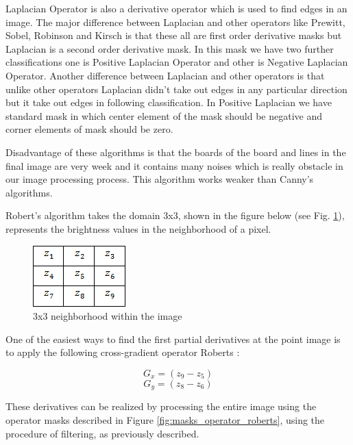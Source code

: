 Laplacian Operator is also a derivative operator which is used to find edges in an image. The major difference between Laplacian and other operators like Prewitt, Sobel, Robinson and Kirsch is that these all are first order derivative masks but Laplacian is a second order derivative mask. In this mask we have two further classifications one is Positive Laplacian Operator and other is Negative Laplacian Operator.
Another difference between Laplacian and other operators is that unlike other operators Laplacian didn’t take out edges in any particular direction but it take out edges in following classification.
In Positive Laplacian we have standard mask in which center element of the mask should be negative and corner elements of mask should be zero. \cite{Huertas}
 
Disadvantage of these algorithms is that the boards of the board and lines in the final image are very week and it contains many noises which is really obstacle in our image processing process. This algorithm works weaker than Canny’s algorithms.

Robert’s algorithm takes the domain 3x3, shown in the figure below (see Fig. \ref{fig:neighborhood_within_image}), represents the brightness values in the neighborhood of a pixel.

\begin{figure}[h]
    \centering
    \includegraphics{Figures/neighborhood_within_image}
    \caption{3x3 neighborhood within the image}
    \label{fig:neighborhood_within_image}
\end{figure}

One of the easiest ways to find the first partial derivatives at the point image is to apply the following cross-gradient operator Roberts \cite{Seif}: 

\begin{equation}
    G_x = (z_9 - z_5)
\end{equation}
\begin{equation}
    G_y = (z_8 - z_6)
\end{equation}

These derivatives can be realized by processing the entire image using the operator masks described in Figure \ref{fig:masks_operator_roberts}, using the procedure of filtering, as previously described.

